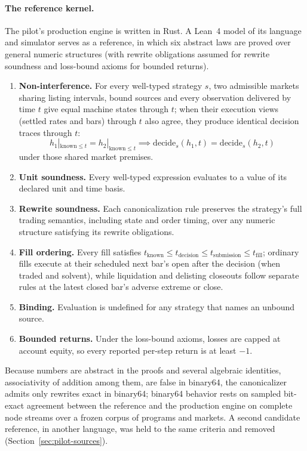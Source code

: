 \documentclass[11pt]{article}
\begin{document}
\paragraph{The reference kernel.} The pilot's production engine is written in Rust. A Lean~4 \cite{demoura2021} model of its language and simulator serves as a reference, in which six abstract laws are proved over general numeric structures (with rewrite obligations assumed for rewrite soundness and loss-bound axioms for bounded returns).
\begin{enumerate}
  \item \textbf{Non-interference.} For every well-typed strategy $s$, two admissible markets sharing listing intervals, bound sources and every observation delivered by time $t$ give equal machine states through $t$; when their execution views (settled rates and bars) through $t$ also agree, they produce identical decision traces through $t$:
  \begin{equation}
    h_1|_{\mathrm{known} \le t} = h_2|_{\mathrm{known} \le t} \implies \mathrm{decide}_s(h_1, t) = \mathrm{decide}_s(h_2, t)
  \end{equation}
  under those shared market premises.
  \item \textbf{Unit soundness.} Every well-typed expression evaluates to a value of its declared unit and time basis.
  \item \textbf{Rewrite soundness.} Each canonicalization rule preserves the strategy's full trading semantics, including state and order timing, over any numeric structure satisfying its rewrite obligations.
  \item \textbf{Fill ordering.} Every fill satisfies $t_{\mathrm{known}} \le t_{\mathrm{decision}} \le t_{\mathrm{submission}} \le t_{\mathrm{fill}}$; ordinary fills execute at their scheduled next bar's open after the decision (when traded and solvent), while liquidation and delisting closeouts follow separate rules at the latest closed bar's adverse extreme or close.
  \item \textbf{Binding.} Evaluation is undefined for any strategy that names an unbound source.
  \item \textbf{Bounded returns.} Under the loss-bound axioms, losses are capped at account equity, so every reported per-step return is at least $-1$.
\end{enumerate}
Because numbers are abstract in the proofs and several algebraic identities, associativity of addition among them, are false in binary64, the canonicalizer admits only rewrites exact in binary64; binary64 behavior rests on sampled bit-exact agreement between the reference and the production engine on complete node streams over a frozen corpus of programs and markets. A second candidate reference, in another language, was held to the same criteria and removed (Section~\ref{sec:pilot-sources}).
\end{document}
